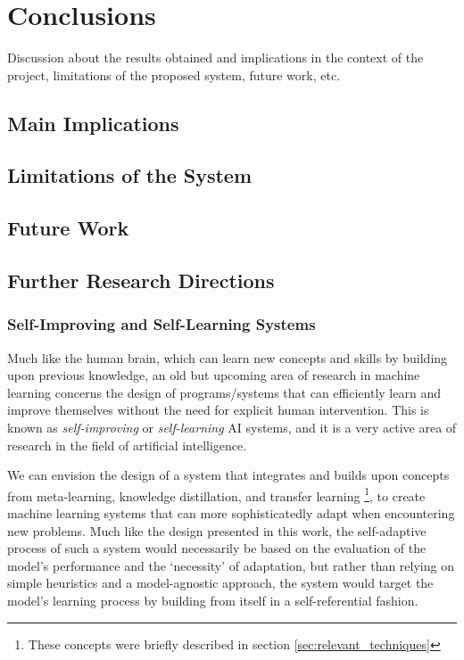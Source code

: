 \documentclass[../main.tex]{subfiles}
\begin{document}
\chapter{Conclusions} \label{chap:conclusions}
    

    Discussion about the results obtained and implications in the context of the project, limitations of the proposed system, future work, etc.
    

    \section{Main Implications} \label{conclusions:implications}

    \section{Limitations of the System} \label{conclusions:limitations}
    
    \section{Future Work} \label{conclusions:future_work}

    \section{Further Research Directions} \label{conclusions:research_directions}
    
    \subsection{Self-Improving and Self-Learning Systems} \label{conclusions:research_directions:l2l}

    Much like the human brain, which can learn new concepts and skills by building upon previous knowledge, an old but upcoming area of research in machine learning concerns the design of programs/systems that can efficiently learn and improve themselves without the need for explicit human intervention. This is known as \textit{self-improving} or \textit{self-learning} AI systems, and it is a very active area of research in the field of artificial intelligence.

    We can envision the design of a system that integrates and builds upon concepts from meta-learning, knowledge distillation, and transfer learning \footnote{These concepts were briefly described in section \ref{sec:relevant_techniques}}, to create machine learning systems that can more sophisticatedly adapt when encountering new problems. Much like the design presented in this work, the self-adaptive process of such a system would necessarily be based on the evaluation of the model's performance and the `necessity' of adaptation, but rather than relying on simple heuristics and a model-agnostic approach, the system would target the model's learning process by building from itself in a self-referential fashion.
\end{document}
